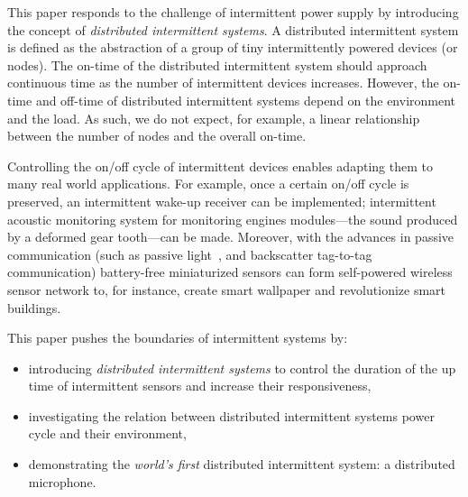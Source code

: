 %
This paper responds to the challenge of intermittent power supply by introducing the concept of \textit{distributed intermittent systems}. A distributed intermittent system is defined as the abstraction of a group of tiny intermittently powered devices (or nodes). The on-time of the distributed intermittent system should approach continuous time as the number of intermittent devices increases. However, the on-time and off-time of  distributed intermittent systems depend on the environment and the load. As such, we do not expect, for example, a linear relationship between the number of nodes and the overall on-time.

Controlling the on/off cycle of intermittent devices enables adapting them to many real world applications. For example, once a certain on/off cycle is preserved, an intermittent wake-up receiver can be implemented; intermittent acoustic monitoring system for monitoring engines modules---the sound produced by a deformed gear tooth---can be made. Moreover, with the advances in passive communication (such as passive light~\cite{}, and backscatter tag-to-tag~\cite{} communication) battery-free miniaturized sensors can form self-powered wireless sensor network to, for instance, create smart wallpaper and revolutionize smart buildings. 


This paper pushes the boundaries of intermittent systems by:
\begin{itemize}
		\item introducing \textit{distributed intermittent systems} to control the duration of the up time of intermittent sensors and increase their responsiveness,
		\item investigating the relation between distributed intermittent systems power cycle and their environment,
		\item demonstrating the \textit{world's first} distributed intermittent system: a distributed microphone. 
\end{itemize}



